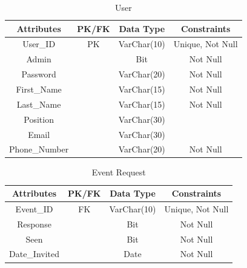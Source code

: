 \documentclass[a4paper]{article}
\begin{document}
\begin{table}[ht]
    \caption{User}
    \centering
    \begin{tabular}{|c|c|c|c|}
        \hline
        Attributes & PK/FK & Data Type & Constraints  \\
        \hline
        User\_ID & PK & VarChar(10) & Unique, Not Null \\
        \hline
        Admin & & Bit & Not Null \\
        \hline
        Password & & VarChar(20) & Not Null \\
        \hline
        First\_Name & & VarChar(15) & Not Null \\
        \hline
        Last\_Name & & VarChar(15) & Not Null \\
        \hline
        Position & & VarChar(30) & \\
        \hline
        Email & & VarChar(30) & \\
        \hline
        Phone\_Number & & VarChar(20) & Not Null \\
        \hline
    \end{tabular}
    \label{tab:user}
\end{table}

\begin{table}[ht] %
    \caption{Event Request}
    \centering
    \begin{tabular}{|c|c|c|c|}
        \hline
        Attributes & PK/FK & Data Type & Constraints  \\
        \hline
        Event\_ID & FK & VarChar(10) & Unique, Not Null \\
        \hline
        Response & & Bit & Not Null \\
        \hline
        Seen & & Bit & Not Null \\
        \hline
        Date\_Invited & & Date & Not Null \\
        \hline
    \end{tabular}
    \label{tab:event_request}
\end{table}
\end{document}
